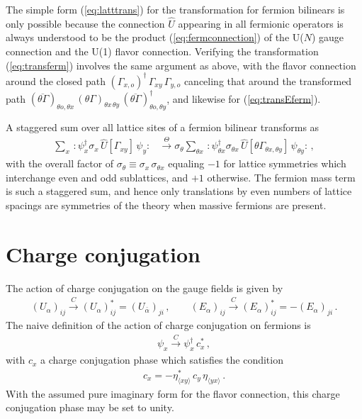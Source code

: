 \documentclass [12pt]{article}
\begin{document}
    The simple form (\ref{eq:latttrans}) for the transformation for fermion bilinears
    is only possible because
    the connection $\hat U$ appearing in all fermionic operators is always
    understood to be the product (\ref{eq:fermconnection}) of the U($N$)
    gauge connection and the U(1) flavor connection.
    Verifying the transformation (\ref{eq:transferm})
    involves
    the same argument as above, with the flavor connection around the closed path
    $(\Gamma_{x,o})^\dagger \, \Gamma_{xy} \, \Gamma_{y,o}$
    canceling that around the
    transformed path
    $
	(\overline{\theta\Gamma})_{\theta o,\theta x} \,
	(\theta\Gamma)_{\theta x\, \theta y} \,
	(\overline{\theta\Gamma})_{\theta o,\theta y}^\dagger
    $,
    and likewise for (\ref{eq:transEferm}).

    A staggered sum over all lattice sites of a fermion bilinear
    transforms as
    \begin{align}
	\sum_x \,
	{:} \psi_x^\dagger \sigma_x \, \hat U[\Gamma_{xy}] \, \psi_y {:}
	&\xrightarrow{\Theta}
	\sigma_\theta
	\sum_{\theta x} \,
	{:} \psi_{\theta x}^\dagger \sigma_{\theta x} \,
	    \hat U[\theta\Gamma_{\theta x , \theta y}] \,
	    \psi_{\theta y} {:} \,,
    \end{align}
    with the overall factor of $\sigma_\theta \equiv \sigma_x \, \sigma_{\theta x}$
    equaling $-1$ for lattice symmetries which interchange even and odd sublattices,
    and $+1$ otherwise.
    The fermion mass term is such a staggered sum, and hence only translations by
    even numbers of lattice spacings
    are symmetries of the theory when massive fermions are present.

\section  {Charge conjugation}\label{sec:ChargeConj}

The action of charge conjugation on the gauge fields is given by
\begin{align}
    (U_\alpha)_{ij}
    \xrightarrow{C}
    (U_\alpha)_{ij}^*
    =
    (U_{\bar\alpha})_{ji} \,,\qquad
    (E_\alpha)_{ij}
    \xrightarrow{C}
    (E_\alpha)_{ij}^*
    =
    -(E_\alpha)_{ji} \,.
\label{eq:Cgauge}
\end{align}
The naive definition of the action of charge conjugation on fermions is
\begin{align}
    \psi_x
    \xrightarrow{C}
    \psi_x^\dagger \, c_x^* \,,
\label{eq:Cfermi}
\end{align}
with $c_x$ a charge conjugation phase which satisfies the
condition
\begin{align}
    c_x = - \eta_{\langle xy \rangle}^* \, c_y \, \eta_{\langle yx \rangle} \,.
\end{align}
With the assumed pure imaginary form for the flavor connection,
this charge conjugation phase may be set to unity.
\end{document}
